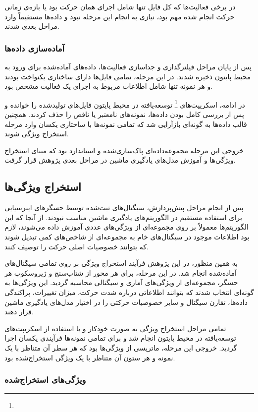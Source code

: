 در برخی فعالیت‌ها که کل فایل تنها شامل اجرای همان حرکت بود یا بازه‌ی زمانی حرکت انجام شده مهم بود، نیازی به انجام این مرحله نبود و داده‌ها مستقیماً وارد مراحل بعدی شدند.


\subsubsection{آماده‌سازی داده‌ها}

پس از پایان مراحل فیلترگذاری و جداسازی فعالیت‌ها، داده‌های آماده‌شده برای ورود به محیط پایتون ذخیره شدند. در این مرحله، تمامی فایل‌ها دارای ساختاری یکنواخت بودند و هر نمونه تنها شامل اطلاعات مربوط به اجرای یک فعالیت مشخص بود.

در ادامه، اسکریپت‌های
\footnote{}
 توسعه‌یافته در محیط پایتون فایل‌های تولیدشده را خوانده و پس از بررسی کامل بودن داده‌ها، نمونه‌های نامعتبر یا ناقص را حذف کردند. همچنین قالب داده‌ها به گونه‌ای بازآرایی شد که تمامی نمونه‌ها با ساختاری یکسان وارد مرحله استخراج ویژگی شوند.

خروجی این مرحله مجموعه‌داده‌ای پاک‌سازی‌شده و استاندارد بود که مبنای استخراج ویژگی‌ها و آموزش مدل‌های یادگیری ماشین در مراحل بعدی پژوهش قرار گرفت.

\subsection{استخراج ویژگی‌ها}

پس از انجام مراحل پیش‌پردازش، سیگنال‌های ثبت‌شده توسط حسگرهای اینرسیایی برای استفاده مستقیم در الگوریتم‌های یادگیری ماشین مناسب نبودند. از آنجا که این الگوریتم‌ها معمولاً بر روی مجموعه‌ای از ویژگی‌های عددی آموزش داده می‌شوند، لازم بود اطلاعات موجود در سیگنال‌های خام به مجموعه‌ای از شاخص‌های کمی تبدیل شوند که بتوانند خصوصیات اصلی حرکت را توصیف کنند.

به همین منظور، در این پژوهش فرآیند استخراج ویژگی بر روی تمامی سیگنال‌های آماده‌شده انجام شد. در این مرحله، برای هر محور از شتاب‌سنج و ژیروسکوپ هر حسگر، مجموعه‌ای از ویژگی‌های آماری و سیگنالی محاسبه گردید. این ویژگی‌ها به گونه‌ای انتخاب شدند که بتوانند اطلاعاتی درباره شدت حرکت، میزان تغییرات، پراکندگی داده‌ها، تقارن سیگنال و سایر خصوصیات حرکتی را در اختیار مدل‌های یادگیری ماشین قرار دهند.

تمامی مراحل استخراج ویژگی به صورت خودکار و با استفاده از اسکریپت‌های توسعه‌یافته در محیط پایتون انجام شد و برای تمامی نمونه‌ها فرآیندی یکسان اجرا گردید. خروجی این مرحله، ماتریسی از ویژگی‌ها بود که هر سطر آن متناظر با یک نمونه و هر ستون آن متناظر با یک ویژگی استخراج‌شده بود.

\subsubsection{ویژگی‌های استخراج‌شده}

